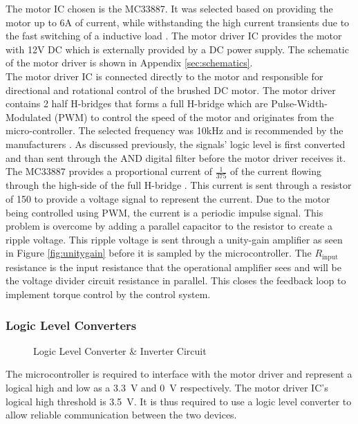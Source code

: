The motor IC chosen is the MC33887. It was selected based on providing the motor up to 6A of current, while withstanding the high current transients due to the fast switching of a inductive load \citep{motorIC}. The motor driver IC provides the motor with 12V DC which is externally provided by a DC power supply. The schematic of the motor driver is shown in Appendix \ref{sec:schematics}.\\

The motor driver IC is connected directly to the motor and responsible for directional and rotational control of the brushed DC motor. The motor driver contains 2 half H-bridges that forms a full H-bridge which are Pulse-Width-Modulated (PWM) to control the speed of the motor and originates from the micro-controller. The selected frequency was 10kHz and is recommended by the manufacturers \cite{motorIC}. As discussed previously, the signals' logic level is first converted and than sent through the AND digital filter before the motor driver receives it.\\

The MC33887 provides a proportional current of $\frac{1}{375}$ of the current flowing through the high-side of the full H-bridge \citep{motorIC}. This current is sent through a resistor of \SI{150}{\Omega} to provide a voltage signal to represent the current. Due to the motor being controlled using PWM, the current is a periodic impulse signal. This problem is overcome by adding a parallel capacitor to the resistor to create a ripple voltage. This ripple voltage is sent through a unity-gain amplifier as seen in Figure \ref{fig:unitygain} before it is sampled by the microcontroller. The $R_{\text{input}}$ resistance is the input resistance that the operational amplifier sees and will be the voltage divider circuit resistance in parallel. This closes the feedback loop to implement torque control by the control system.\\


\subsubsection{Logic Level Converters}
\begin{figure}[h]
	\centering
	
	\caption{Logic Level Converter \& Inverter Circuit}
	\label{fig:interterCirc}
\end{figure}


The microcontroller is required to interface with the motor driver and represent a logical high and low as a \SI{3.3}{V} and \SI{0}{V} respectively. The motor driver IC's logical high threshold is \SI{3.5}{V}. It is thus required to use a logic level converter to allow reliable communication between the two devices.\\

